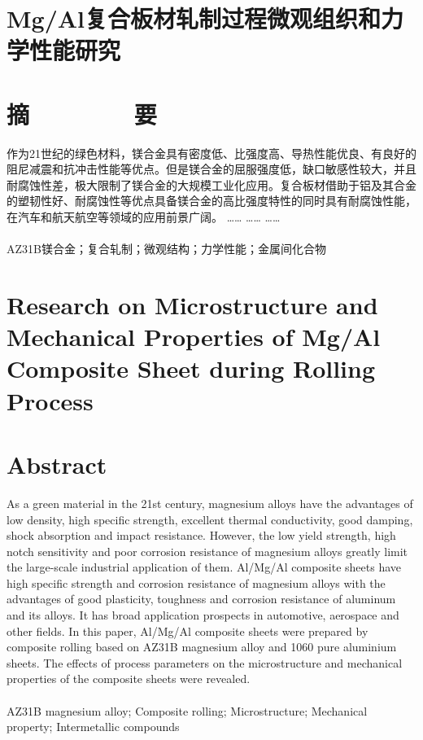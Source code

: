 \section*{\heiti Mg/Al复合板材轧制过程微观组织和力学性能研究}
\section*{\heiti 摘\ \ \ \ \ \ \ \ 要}

作为21世纪的绿色材料，镁合金具有密度低、比强度高、导热性能优良、有良好的阻尼减震和抗冲击性能等优点。但是镁合金的屈服强度低，缺口敏感性较大，并且耐腐蚀性差，极大限制了镁合金的大规模工业化应用。复合板材借助于铝及其合金的塑韧性好、耐腐蚀性等优点具备镁合金的高比强度特性的同时具有耐腐蚀性能，在汽车和航天航空等领域的应用前景广阔。
……
……
……
\\
\\
AZ31B镁合金；复合轧制；微观结构；力学性能；金属间化合物

\clearpage


\section*{\bfseries Research on Microstructure and Mechanical Properties of Mg/Al Composite Sheet during Rolling Process}



\section*{\bfseries Abstract}

As a green material in the 21st century, magnesium alloys have the advantages of low density, high specific strength, excellent thermal conductivity, good damping, shock absorption and impact resistance. However, the low yield strength, high notch sensitivity and poor corrosion resistance of magnesium alloys greatly limit the large-scale industrial application of them. Al/Mg/Al composite sheets have high specific strength and corrosion resistance of magnesium alloys with the advantages of good plasticity, toughness and corrosion resistance of aluminum and its alloys. It has broad application prospects in automotive, aerospace and other fields. In this paper, Al/Mg/Al composite sheets were prepared by composite rolling based on AZ31B magnesium alloy and 1060 pure aluminium sheets. The effects of process parameters on the microstructure and mechanical properties of the composite sheets were revealed.
	\\
	\\
	AZ31B magnesium alloy; Composite rolling; Microstructure; Mechanical property; Intermetallic compounds

\clearpage




